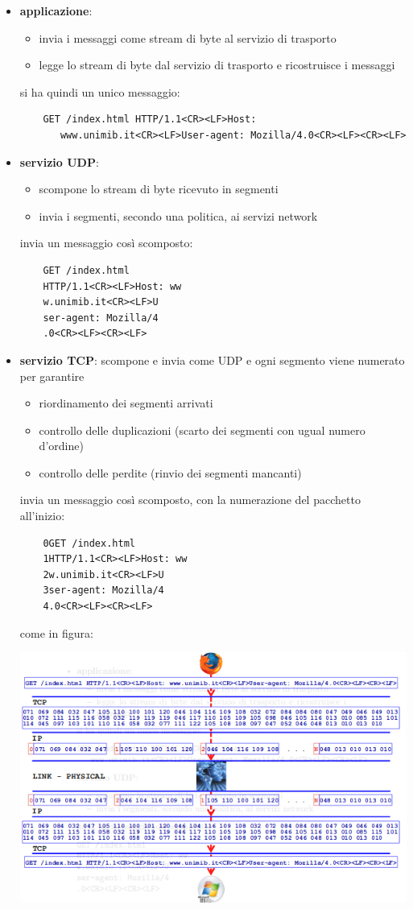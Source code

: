 \documentclass[a4paper,12pt, oneside]{book}
\begin{document}
\begin{itemize}
	\item \textbf{applicazione}:
	\begin{itemize}
		\item invia i messaggi come stream di byte al servizio di trasporto
		\item legge lo stream di byte dal servizio di trasporto e ricostruisce i messaggi
\end{itemize}
	si ha quindi un unico messaggio:
	\begin{verbatim}
	GET /index.html HTTP/1.1<CR><LF>Host:
	   www.unimib.it<CR><LF>User-agent: Mozilla/4.0<CR><LF><CR><LF> 
	\end{verbatim}
	\item \textbf{servizio UDP}:
	\begin{itemize}
		\item scompone lo stream di byte ricevuto in segmenti 
		\item invia i segmenti, secondo una politica, ai servizi network
\end{itemize}
invia un messaggio così scomposto:
	\begin{verbatim}
	GET /index.html 
	HTTP/1.1<CR><LF>Host: ww
	w.unimib.it<CR><LF>U
	ser-agent: Mozilla/4
	.0<CR><LF><CR><LF>  
	\end{verbatim}
	\item \textbf{servizio TCP}: 
	scompone e invia come UDP e ogni segmento viene numerato per garantire
	\begin{itemize}
		\item riordinamento dei segmenti arrivati 
		\item controllo delle duplicazioni (scarto dei segmenti con ugual numero d'ordine)
		\item controllo delle perdite (rinvio dei segmenti mancanti) 
\end{itemize}
invia un messaggio così scomposto, con la numerazione del pacchetto all'inizio:
	\begin{verbatim}
	0GET /index.html 
	1HTTP/1.1<CR><LF>Host: ww
	2w.unimib.it<CR><LF>U
	3ser-agent: Mozilla/4
	4.0<CR><LF><CR><LF>  
	\end{verbatim}
	come in figura:
	\begin{center}
		
		\includegraphics[scale=2.7]{img/send.png}
	\end{center}
\end{itemize}
\newpage
\end{document}
